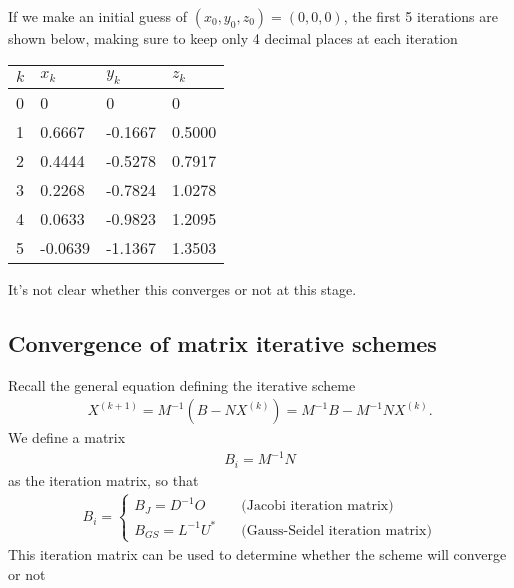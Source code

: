 {If we make an initial guess of $(x_0,y_0,z_0)=(0,0,0)$, the first 5 iterations are shown below, making sure to keep only 4 decimal places at each iteration
\begin{table}[H]
\begin{center}
\begin{tabular}{l||l|l|l}
$k$ & $x_k$ & $y_k$ & $z_k$ \\ \hline
0 &  0      &       0 &      0 \\
1 &  0.6667 & -0.1667 & 0.5000 \\
2 &  0.4444 & -0.5278 & 0.7917 \\
3 &  0.2268 & -0.7824 & 1.0278 \\
4 &  0.0633 & -0.9823 & 1.2095 \\
5 & -0.0639 & -1.1367 & 1.3503 
\end{tabular}
\end{center}
\end{table}
It's not clear whether this converges or not at this stage.
}{\downline}

\subsection*{Convergence of matrix iterative schemes}
Recall the general equation defining the iterative scheme
\begin{align*}
X^{(k+1)} = M^{-1}\left(B - NX^{(k)}\right) = M^{-1}B - M^{-1}NX^{(k)}.
\end{align*}
We define a matrix
\begin{align*}
B_i = M^{-1}N
\end{align*}
as the iteration matrix, so that
\begin{align*}
B_i = \begin{cases}
B_J = D^{-1}O &  \quad\text{(Jacobi iteration matrix)} \\
B_{GS} = L^{-1}U^* & \quad\text{(Gauss-Seidel iteration matrix)} 
\end{cases}
\end{align*}
This iteration matrix can be used to determine whether the scheme will converge or not

